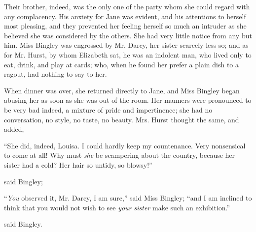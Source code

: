 Their brother, indeed, was the only one of the party whom she could regard with any complacency. His anxiety for Jane was evident, and his attentions to herself most pleasing, and they prevented her feeling herself so much an intruder as she believed she was considered by the others. She had very little notice from any but him. Miss Bingley was engrossed by Mr. Darcy, her sister scarcely less so; and as for Mr. Hurst, by whom Elizabeth sat, he was an indolent man, who lived only to eat, drink, and play at cards; who, when he found her prefer a plain dish to a ragout, had nothing to say to her.

When dinner was over, she returned directly to Jane, and Miss Bingley began abusing her as soon as she was out of the room. Her manners were pronounced to be very bad indeed, a mixture of pride and impertinence; she had no conversation, no style, no taste, no beauty. Mrs. Hurst thought the same, and added,


“She did, indeed, Louisa. I could hardly keep my countenance. Very nonsensical to come at all! Why must {\em she} be scampering about the country, because her sister had a cold? Her hair so untidy, so blowsy!”


 said Bingley; 

“{\em You} observed it, Mr. Darcy, I am sure,” said Miss Bingley; “and I am inclined to think that you would not wish to see {\em your sister} make such an exhibition.”



 said Bingley.

